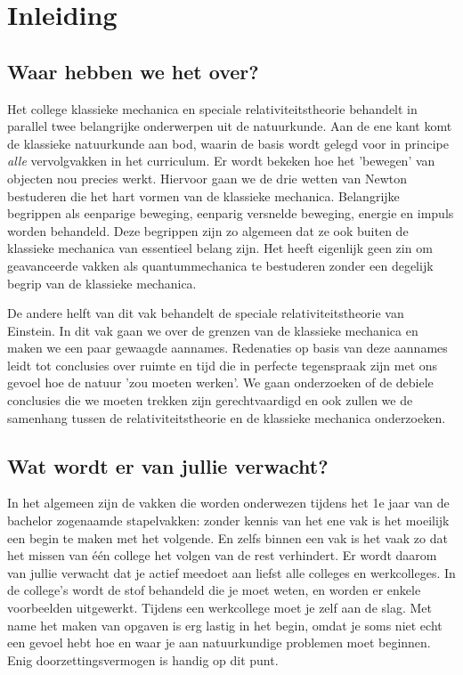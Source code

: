 \chapter*{Inleiding}

\section*{Waar hebben we het over?}

Het college klassieke mechanica en speciale relativiteitstheorie behandelt in parallel twee belangrijke 
onderwerpen uit de natuurkunde. Aan de ene kant komt de klassieke natuurkunde aan bod, waarin de
basis wordt gelegd voor in principe \emph{alle} vervolgvakken in het curriculum. Er wordt bekeken hoe
het 'bewegen' van objecten nou precies werkt. Hiervoor gaan we de drie wetten van Newton bestuderen
die het hart vormen van de klassieke mechanica. Belangrijke begrippen als eenparige beweging, 
eenparig versnelde beweging, energie en impuls worden behandeld. Deze begrippen zijn zo algemeen
dat ze ook buiten de klassieke mechanica van essentieel belang zijn. Het heeft eigenlijk geen zin om 
geavanceerde vakken als quantummechanica te bestuderen zonder een degelijk begrip van de klassieke
mechanica. 

De andere helft van dit vak behandelt de speciale relativiteitstheorie van Einstein. In dit vak gaan we over
de grenzen van de klassieke mechanica en maken we een paar gewaagde aannames. Redenaties op 
basis van deze aannames leidt tot conclusies over ruimte en tijd die in perfecte tegenspraak zijn met
ons gevoel hoe de natuur 'zou moeten werken'. We gaan onderzoeken of de debiele conclusies die
we moeten trekken zijn gerechtvaardigd en ook zullen we de samenhang tussen de relativiteitstheorie en
de klassieke mechanica onderzoeken.

\section*{Wat wordt er van jullie verwacht?}

In het algemeen zijn de vakken die worden onderwezen tijdens het 1e jaar van de bachelor zogenaamde 
stapelvakken: zonder kennis van het ene  vak is het moeilijk een begin te maken met het volgende. En zelfs
binnen een vak is het vaak zo dat het missen van \'{e}\'{e}n college het volgen van de rest verhindert. Er 
wordt daarom van jullie verwacht dat je actief meedoet aan liefst alle colleges en werkcolleges. In de
college's wordt de stof behandeld die je moet weten, en worden er enkele voorbeelden uitgewerkt. Tijdens
een werkcollege moet je zelf aan de slag. Met name het maken van opgaven is erg lastig in het begin, omdat
je soms niet echt een gevoel hebt hoe en waar je aan natuurkundige problemen moet beginnen.  Enig 
doorzettingsvermogen is handig op dit punt. 

